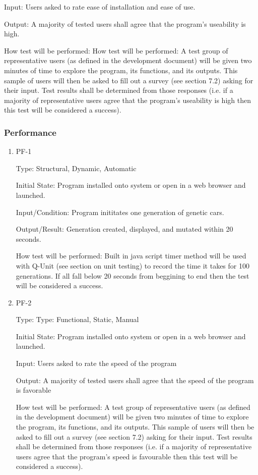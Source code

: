 \documentclass[12pt, titlepage]{article}
\begin{document}
\begin{enumerate}
Input: Users asked to rate ease of installation and ease of use.
					
Output: A majority of tested users shall agree  that the program's useability is high.
					
How test will be performed: How test will be performed: A test group of representative users (as defined in the development document) will be given two minutes of time to explore the program, its functions, and its outputs. This sample of users will then be asked to fill out a survey (see section 7.2) asking for their input. Test results shall be determined from those responses (i.e. if a majority of representative users agree that the program's useability is high then this test will be considered a success).

\end{enumerate}

\subsubsection{Performance}

\begin{enumerate}

\item{PF-1\\}

Type: Structural, Dynamic, Automatic
					
Initial State: Program installed onto system or open in a web browser and launched.
					
Input/Condition: Program inititates one generation of genetic cars.
					
Output/Result: Generation created, displayed, and mutated within 20 seconds.
					
How test will be performed: Built in java script timer method will be used with Q-Unit (see section on unit testing) to record the time it takes for 100 generations. If all fall below 20 seconds from beggining to end then the test will be considered a success.


\item{PF-2\\}

Type: Type: Functional, Static, Manual
					
Initial State: Program installed onto system or open in a web browser and launched.
					
Input: Users asked to rate the speed of the program
					
Output: A majority of tested users shall agree that the speed of the program is favorable
					
 How test will be performed: A test group of representative users (as defined in the development document) will be given two minutes of time to explore the program, its functions, and its outputs. This sample of users will then be asked to fill out a survey (see section 7.2) asking for their input. Test results shall be determined from those responses (i.e. if a majority of representative users agree that the program's speed is favourable then this test will be considered a success).

\end{enumerate}
\end{document}
